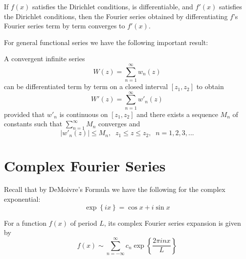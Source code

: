 \documentclass[12pt, a4paper, oneside, openright, titlepage]{book}
\begin{document}
\begin{thm}
    If $f(x)$ satisfies the Dirichlet conditions, is differentiable, and $f'(x)$ satisfies the Dirichlet conditions, then the Fourier series obtained by differentiating $f$'s Fourier series term by term converges to $f'(x)$.
\end{thm}

For general functional series we have the following important result: 

\begin{thm}
    A convergent infinite series \begin{equation*}
        W(z) = \sum_{n=1}^{\infty}w_n(z)
    \end{equation*}
    can be differentiated term by term on a closed interval $[z_1,z_2]$ to obtain \begin{equation*}
        W'(z) = \sum_{n=1}^{\infty}w'_n(z)
    \end{equation*}
    provided that $w'_n$ is continuous on $[z_1,z_2]$ and there exists a sequence $M_n$ of constants such that $\sum_{n=1}^{\infty}M_n$ converges and \begin{equation*}
        |w'_n(z)| \leq M_n,\;\;z_1 \leq z \leq z_2,\;\;n=1,2,3,...
    \end{equation*}
\end{thm}


\section{Complex Fourier Series}

Recall that by DeMoivre's Formula we have the following for the complex exponential: \begin{equation*}
    \exp\left\{ix\right\} = \cos x + i\sin x
\end{equation*}
\begin{defn}
    For a function $f(x)$ of period $L$, its complex Fourier series expansion is given by \begin{equation*}
        f(x) \sim \sum_{n=-\infty}^{\infty}c_n\exp\left\{\frac{2\pi inx}{L}\right\}
    \end{equation*}
\end{defn}
\end{document}
